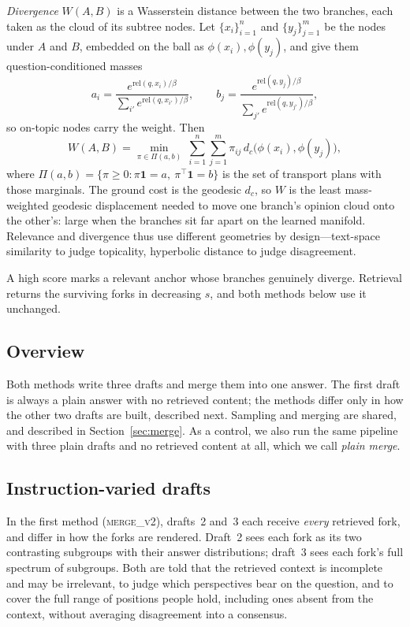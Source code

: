 \documentclass[11pt]{article}
\begin{document}
\emph{Divergence} $W(A, B)$ is a Wasserstein distance between the two branches,
each taken as the cloud of its subtree nodes. Let $\{x_i\}_{i=1}^{n}$ and
$\{y_j\}_{j=1}^{m}$ be the nodes under $A$ and $B$, embedded on the ball as
$\phi(x_i), \phi(y_j)$, and give them question-conditioned masses
\begin{equation}
  a_i = \frac{e^{\mathrm{rel}(q, x_i)/\beta}}{\sum_{i'} e^{\mathrm{rel}(q, x_{i'})/\beta}},
  \qquad
  b_j = \frac{e^{\mathrm{rel}(q, y_j)/\beta}}{\sum_{j'} e^{\mathrm{rel}(q, y_{j'})/\beta}},
\end{equation}
so on-topic nodes carry the weight. Then
\begin{equation}
  W(A, B) = \min_{\pi \in \Pi(a, b)}\ \sum_{i=1}^{n} \sum_{j=1}^{m}
            \pi_{ij}\, d_c\bigl(\phi(x_i), \phi(y_j)\bigr),
\end{equation}
where $\Pi(a, b) = \{\pi \ge 0 : \pi\mathbf{1} = a,\ \pi^\top\mathbf{1} = b\}$ is
the set of transport plans with those marginals. The ground cost is the geodesic
$d_c$, so $W$ is the least mass-weighted geodesic displacement needed to move one
branch's opinion cloud onto the other's: large when the branches sit far apart on
the learned manifold. Relevance and divergence thus use different geometries by
design---text-space similarity to judge topicality, hyperbolic distance to judge
disagreement.

A high score marks a relevant anchor whose branches genuinely diverge. Retrieval
returns the surviving forks in decreasing $s$, and both methods below use it
unchanged.

\subsection{Overview}

Both methods write three drafts and merge them into one answer. The first draft
is always a plain answer with no retrieved content; the methods differ only in
how the other two drafts are built, described next. Sampling and merging are
shared, and described in Section~\ref{sec:merge}. As a control, we also run the
same pipeline with three plain drafts and no retrieved content at all, which we
call \emph{plain merge}.

\subsection{Instruction-varied drafts}

In the first method (\textsc{merge\_v2}), drafts~2 and~3 each receive
\emph{every} retrieved fork, and differ in how the forks are rendered. Draft~2
sees each fork as its two contrasting subgroups with their answer
distributions; draft~3 sees each fork's full spectrum of subgroups. Both are
told that the retrieved context is incomplete and may be irrelevant, to judge
which perspectives bear on the question, and to cover the full range of
positions people hold, including ones absent from the context, without
averaging disagreement into a consensus.
\end{document}
